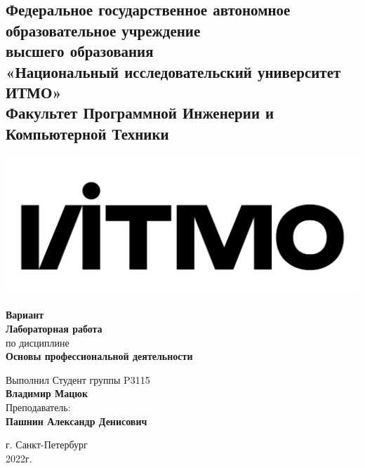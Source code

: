 \documentclass{article}
\begin{document}
\begin{center}
  \section*{
    Федеральное государственное автономное образовательное учреждение\\ высшего образования\\
    «Национальный исследовательский университет ИТМО»\\
    Факультет Программной Инженерии и Компьютерной Техники \\
   }
  \includegraphics[scale=0.2]{../../lib/img/itmo.png}
\end{center}
\vspace{4cm}


\begin{center}
  \large \textbf{Вариант }\\
  \textbf{Лабораторная работа }\\
  по дисциплине\\
  \textbf{Основы профессиональной деятельности}
\end{center}

\vspace*{\fill}

\begin{flushright}
  Выполнил Студент группы P3115\\
  \textbf{Владимир Мацюк}\\
  Преподаватель: \\
  \textbf{Пашнин Александр Денисович}\\
\end{flushright}

\vspace{1cm}

\begin{center}
  г. Санкт-Петербург\\
  2022г.
\end{center}
\end{document}

